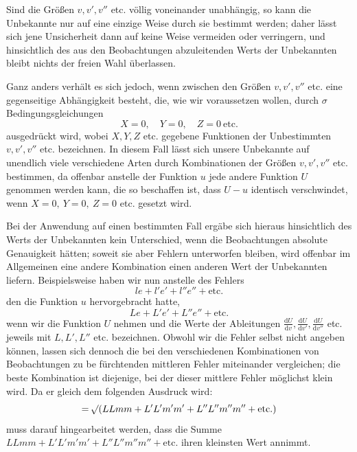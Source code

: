Sind die Größen \(v,v',v''\) etc. völlig voneinander unabhängig, so kann die Unbekannte nur auf eine einzige Weise durch sie bestimmt werden; daher lässt sich jene Unsicherheit dann auf keine Weise vermeiden oder verringern, und hinsichtlich des aus den Beobachtungen abzuleitenden Werts der Unbekannten bleibt nichts der freien Wahl überlassen.

Ganz anders verhält es sich jedoch, wenn zwischen den Größen \(v,v',v''\) etc. eine gegenseitige Abhängigkeit besteht, die, wie wir voraussetzen wollen, durch \(\sigma\) Bedingungsgleichungen
\[
X=0,\quad Y=0,\quad Z=0\ \text{etc.}
\]
ausgedrückt wird, wobei \(X,Y,Z\) etc. gegebene Funktionen der Unbestimmten \(v,v',v''\) etc. bezeichnen. In diesem Fall lässt sich unsere Unbekannte auf unendlich viele verschiedene Arten durch Kombinationen der Größen \(v,v',v''\) etc. bestimmen, da offenbar anstelle der Funktion \(u\) jede andere Funktion \(U\) genommen werden kann, die so beschaffen ist, dass \(U-u\) identisch verschwindet, wenn \(X=0,\ Y=0,\ Z=0\) etc. gesetzt wird.

Bei der Anwendung auf einen bestimmten Fall ergäbe sich hieraus hinsichtlich des Werts der Unbekannten kein Unterschied, wenn die Beobachtungen absolute Genauigkeit hätten; soweit sie aber Fehlern unterworfen bleiben, wird offenbar im Allgemeinen eine andere Kombination einen anderen Wert der Unbekannten liefern. Beispielsweise haben wir nun anstelle des Fehlers
\[
le+l'e'+l''e''+\text{etc.}
\]
den die Funktion \(u\) hervorgebracht hatte,
\[
Le+L'e'+L''e''+\text{etc.}
\]
wenn wir die Funktion \(U\) nehmen und die Werte der Ableitungen \(\frac{\mathrm dU}{\mathrm dv},\frac{\mathrm dU}{\mathrm dv'},\frac{\mathrm dU}{\mathrm dv''}\) etc. jeweils mit \(L,L',L''\) etc. bezeichnen. Obwohl wir die Fehler selbst nicht angeben können, lassen sich dennoch die bei den verschiedenen Kombinationen von Beobachtungen zu be%
%
fürchtenden mittleren Fehler miteinander vergleichen; die beste Kombination ist diejenige, bei der dieser mittlere Fehler möglichst klein wird. Da er gleich dem folgenden Ausdruck wird:
\[
=\mathord{{}^{}\!\surd}(LLmm+L'L'm'm'+L''L''m''m''+\text{etc.})
\]
muss darauf hingearbeitet werden, dass die Summe \(LLmm+L'L'm'm'+L''L''m''m''+\text{etc.}\) ihren kleinsten Wert annimmt.

